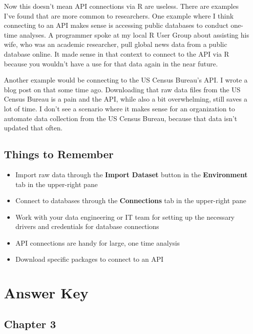 \documentclass[
]{book}
\providecommand{\tightlist}{%
  \setlength{\itemsep}{0pt}\setlength{\parskip}{0pt}}
\begin{document}
\begin{center}
Now this doesn't mean API connections via R are useless. There are examples I've found that are more common to researchers. One example where I think connecting to an API makes sense is accessing public databases to conduct one-time analyses. A programmer spoke at my local R User Group about assisting his wife, who was an academic researcher, pull global news data from a public database online. It made sense in that context to connect to the API via R because you wouldn't have a use for that data again in the near future.

Another example would be connecting to the US Census Bureau's API. I wrote a blog post on that some time ago. Downloading that raw data files from the US Census Bureau is a pain and the API, while also a bit overwhelming, still saves a lot of time. I don't see a scenario where it makes sense for an organization to automate data collection from the US Census Bureau, because that data isn't updated that often.

\hypertarget{things-to-remember-7}{%
\section{Things to Remember}\label{things-to-remember-7}}

\begin{itemize}
\tightlist
\item
  Import raw data through the \textbf{Import Dataset} button in the \textbf{Environment} tab in the upper-right pane
\item
  Connect to databases through the \textbf{Connections} tab in the upper-right pane
\item
  Work with your data engineering or IT team for setting up the necessary drivers and credentials for database connections
\item
  API connections are handy for large, one time analysis
\item
  Download specific packages to connect to an API
\end{itemize}

\hypertarget{answers}{%
\chapter{Answer Key}\label{answers}}

\hypertarget{chapter-3}{%
\section{Chapter 3}\label{chapter-3}}


\end{center}
\end{document}
